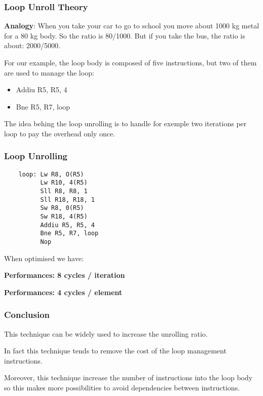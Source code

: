 
\begin{frame}
  \frametitle{Loop Unroll Theory}

  \textbf{Analogy}: When you take your car to go to school you move
  about 1000 kg metal for a 80 kg body. So the ratio is 80/1000. But
  if you take the bus, the ratio is about: 2000/5000.

  \nl

  For our example, the loop body is composed of five instructions, but
  two of them are used to manage the loop:

  \begin{itemize}[<+->]
    \item
      Addiu R5, R5, 4
    \item
      Bne R5, R7, loop
  \end{itemize}

  The idea behing the loop unrolling is to handle for exemple two
  iterations per loop to pay the overhead only once.
\end{frame}


\begin{frame}[containsverbatim]
  \frametitle{Loop Unrolling}

  \begin{verbatim}
    loop: Lw R8, O(R5)
          Lw R10, 4(R5)
          Sll R8, R8, 1
          Sll R18, R18, 1
          Sw R8, 0(R5)
          Sw R18, 4(R5)
          Addiu R5, R5, 4
          Bne R5, R7, loop
          Nop
  \end{verbatim}

  When optimised we have:

  \nl

  \textbf{Performances: 8 cycles / iteration}

  \textbf{Performances: 4 cycles / element}
\end{frame}


\begin{frame}
  \frametitle{Conclusion}

  This technique can be widely used to increase the unrolling ratio.

  \nl

  In fact this technique tends to remove the cost of the loop management
  instructions.

  \nl

  Moreover, this technique increase the number of instructions into the
  loop body so this makes more possibilities to avoid dependencies
  between instructions.
\end{frame}

